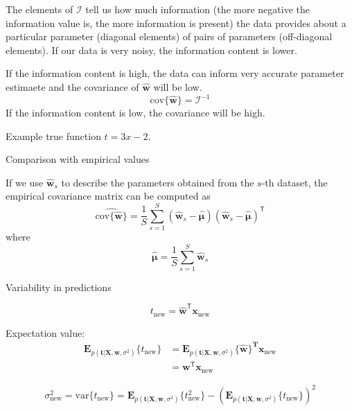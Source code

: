 \documentclass[a4paper,11pt]{article} %
\begin{document}
The elements of $\mathcal{I}$ tell us how much information (the more negative the
information value is, the more information is present) the data provides about
a particular parameter (diagonal elements) of pairs of parameters (off-diagonal elements).
If our data is very noisy, the information content is lower.

If the information content is high, the data can inform very accurate parameter
estimaete and the covariance of $\widehat{\mathbf{w}}$ will be low.
\begin{equation*}
\mathrm{cov}\{\widehat{\mathbf{w}}\} = \mathcal{I}^{-1}
\end{equation*}
If the information content is low, the covariance will be high.

Example true function $t = 3x - 2$.

Comparison with empirical values


If we use $\widehat{\mathbf{w}}_{s}$ to describe the parameters obtained from the $s$-th
dataset, the empirical covariance matrix can be computed as
\begin{equation*}
\widehat{ \mathrm{cov} \{ \widehat{\mathbf{w}} \} } = \frac{1}{S} \sum_{s=1}^{S}
\left( \widehat{\mathbf{w}}_{s} - \widehat{\boldsymbol{\mu}} \right)
\left( \widehat{\mathbf{w}}_{s} - \widehat{\boldsymbol{\mu}} \right)^{\mathsf{T}}
\end{equation*}
where
\begin{equation*}
\widehat{\boldsymbol{\mu}} = \frac{1}{S} \sum_{s=1}^{S} \widehat{\mathbf{w}}_{s}
\end{equation*}

Variability in predictions

\begin{equation}
t_{\mathrm{new}} = \widehat{\mathbf{w}}^{\mathsf{T}}\mathbf{x}_{\mathrm{new}}
\end{equation}

Expectation value:
\begin{align*}
\mathbf{E}_{p(\mathbf{t}|\mathbf{X},\mathbf{w},\sigma^2)}\{t_{\mathrm{new}}\} & =
\mathbf{E}_{p(\mathbf{t}|\mathbf{X},\mathbf{w},\sigma^2)}\{\widehat{\mathbf{w}}\}^{\mathbf{T}}
\mathbf{x}_{\mathrm{new}} \\
& = \mathbf{w}^{\mathsf{T}}\mathbf{x}_{\mathrm{new}}
\end{align*}


\begin{equation}
\sigma^2_{\mathrm{new}} = \mathrm{var}\{t_{\mathrm{new}}\} =
\mathbf{E}_{p(\mathbf{t}|\mathbf{X},\mathbf{w},\sigma^2)}\{t^{2}_{\mathrm{new}}\} -
(\mathbf{E}_{p(\mathbf{t}|\mathbf{X},\mathbf{w},\sigma^2)}\{t_{\mathrm{new}}\})^{2}
\end{equation}
\end{document}
